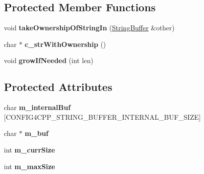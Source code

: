 \subsection*{Protected Member Functions}
\begin{DoxyCompactItemize}
\item 
\hypertarget{classCONFIG4CPP__NAMESPACE_1_1StringBuffer_a1dc030d3865b50c51737e04ee3498b48}{void {\bfseries take\-Ownership\-Of\-String\-In} (\hyperlink{classCONFIG4CPP__NAMESPACE_1_1StringBuffer}{String\-Buffer} \&other)}\label{classCONFIG4CPP__NAMESPACE_1_1StringBuffer_a1dc030d3865b50c51737e04ee3498b48}

\item 
\hypertarget{classCONFIG4CPP__NAMESPACE_1_1StringBuffer_acd8de0854b9c10ec96881a08a974f5f4}{char $\ast$ {\bfseries c\-\_\-str\-With\-Ownership} ()}\label{classCONFIG4CPP__NAMESPACE_1_1StringBuffer_acd8de0854b9c10ec96881a08a974f5f4}

\item 
\hypertarget{classCONFIG4CPP__NAMESPACE_1_1StringBuffer_a95a65158793be7b5cac2df6c1d99c8d1}{void {\bfseries grow\-If\-Needed} (int len)}\label{classCONFIG4CPP__NAMESPACE_1_1StringBuffer_a95a65158793be7b5cac2df6c1d99c8d1}

\end{DoxyCompactItemize}
\subsection*{Protected Attributes}
\begin{DoxyCompactItemize}
\item 
\hypertarget{classCONFIG4CPP__NAMESPACE_1_1StringBuffer_a8543762e6ab03480937d51208f5c3647}{char {\bfseries m\-\_\-internal\-Buf} \mbox{[}C\-O\-N\-F\-I\-G4\-C\-P\-P\-\_\-\-S\-T\-R\-I\-N\-G\-\_\-\-B\-U\-F\-F\-E\-R\-\_\-\-I\-N\-T\-E\-R\-N\-A\-L\-\_\-\-B\-U\-F\-\_\-\-S\-I\-Z\-E\mbox{]}}\label{classCONFIG4CPP__NAMESPACE_1_1StringBuffer_a8543762e6ab03480937d51208f5c3647}

\item 
\hypertarget{classCONFIG4CPP__NAMESPACE_1_1StringBuffer_a24ac4d0b413c49628207bae7b4d7a26b}{char $\ast$ {\bfseries m\-\_\-buf}}\label{classCONFIG4CPP__NAMESPACE_1_1StringBuffer_a24ac4d0b413c49628207bae7b4d7a26b}

\item 
\hypertarget{classCONFIG4CPP__NAMESPACE_1_1StringBuffer_a9b7a21d0a9f0b0de48f72efe098d62e1}{int {\bfseries m\-\_\-curr\-Size}}\label{classCONFIG4CPP__NAMESPACE_1_1StringBuffer_a9b7a21d0a9f0b0de48f72efe098d62e1}

\item 
\hypertarget{classCONFIG4CPP__NAMESPACE_1_1StringBuffer_a5a643582a16756d2d254bf23757c296b}{int {\bfseries m\-\_\-max\-Size}}\label{classCONFIG4CPP__NAMESPACE_1_1StringBuffer_a5a643582a16756d2d254bf23757c296b}

\end{DoxyCompactItemize}
